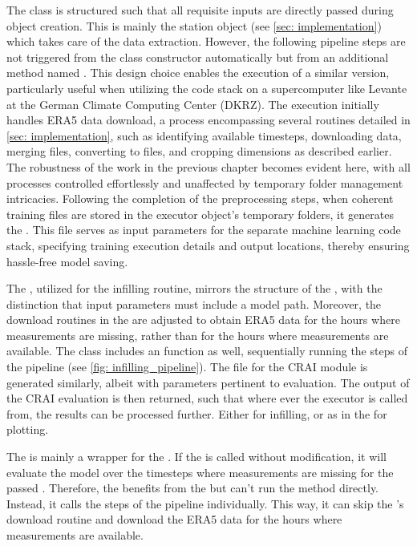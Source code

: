 The  class is structured such that all requisite inputs are directly passed during object creation. This is mainly the station object (see \autoref{sec: implementation}) which takes care of the data extraction. 
However, the following pipeline steps are not triggered from the class constructor automatically but from an additional method named .
This design choice enables the execution of a similar  version, particularly useful when utilizing the code stack on a supercomputer like Levante at the German Climate Computing Center (DKRZ).
The execution initially handles ERA5 data download, a process encompassing several routines detailed in \autoref{sec: implementation}, such as identifying available timesteps, downloading data, merging  files, converting to  files, and cropping dimensions as described earlier.
The robustness of the work in the previous chapter becomes evident here, with all processes controlled effortlessly and unaffected by temporary folder management intricacies.
Following the completion of the preprocessing steps, when coherent training files are stored in the executor object's temporary folders, it generates the .
This file serves as input parameters for the separate machine learning code stack, specifying training execution details and output locations, thereby ensuring hassle-free model saving.

The , utilized for the infilling routine, mirrors the structure of the , with the distinction that input parameters must include a model path.
Moreover, the download routines in the  are adjusted to obtain ERA5 data for the hours where measurements are missing, rather than for the hours where measurements are available.
The class includes an  function as well, sequentially running the steps of the pipeline (see \autoref{fig: infilling_pipeline}).
The  file for the CRAI module is generated similarly, albeit with parameters pertinent to evaluation.
The output of the CRAI evaluation is then returned, such that where ever the executor is called from, the results can be processed further.
Either for infilling, or as in the  for plotting. 

The  is mainly a wrapper for the . If the  is called without modification, it will evaluate the model over the timesteps where measurements are missing for the passed . Therefore, the  benefits from the  but can't run the  method directly. Instead, it calls the steps of the pipeline individually. This way, it can skip the 's download routine and download the ERA5 data for the hours where measurements are available.


